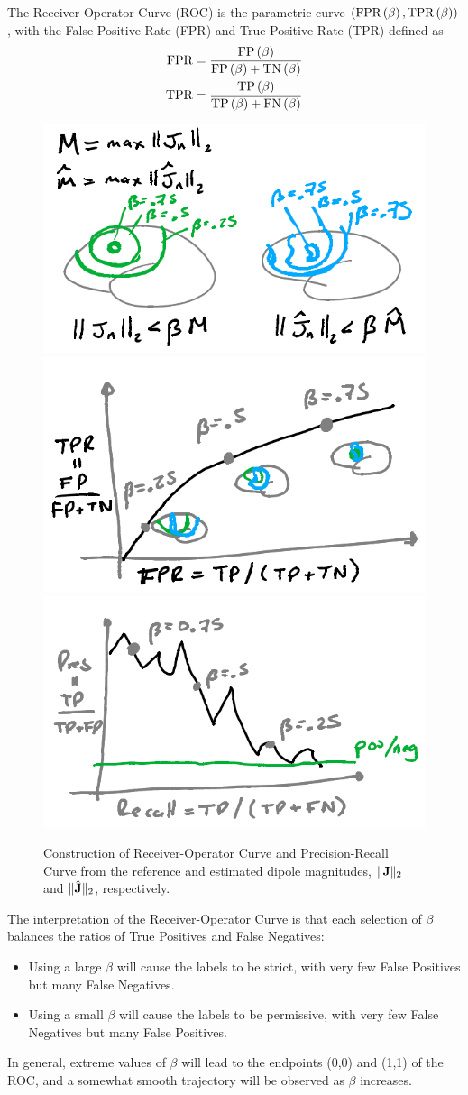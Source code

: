The Receiver-Operator Curve (ROC) is the parametric curve 
$\left( \text{FPR}\left( \beta \right), \text{TPR}\left( \beta \right) \right)$, with the False Positive Rate (FPR) and True Positive Rate (TPR) defined as
\begin{align}
\text{FPR}
&=
\frac{ \text{FP}\left( \beta \right) }{\text{FP}\left( \beta \right) + \text{TN}\left( \beta \right)}
\\
\text{TPR}
&=
\frac{ \text{TP}\left( \beta \right) }{\text{TP}\left( \beta \right) + \text{FN}\left( \beta \right)}
\end{align}

\begin{figure}
\centering
\includegraphics[width=0.8\linewidth]{./img_dev/nsCurves1}
%
\includegraphics[width=0.4\linewidth]{./img_dev/nsCurves2}
\includegraphics[width=0.4\linewidth]{./img_dev/nsCurves3}
\caption{Construction of Receiver-Operator Curve and Precision-Recall Curve from the reference and estimated dipole magnitudes, $\lVert {\mathbf{J}} \rVert_2$ and $\lVert \hat{\mathbf{J}} \rVert_2$, respectively.}
\end{figure}

The interpretation of the Receiver-Operator Curve is that each selection of $\beta$ balances the ratios of True Positives and False Negatives:
\begin{itemize}
\item 
Using a large $\beta$ will cause the labels to be strict, with very few False Positives but many False Negatives.
\item
Using a small $\beta$ will cause the labels to be permissive, with very few False Negatives but many False Positives.
\end{itemize}
In general, extreme values of $\beta$ will lead to the endpoints (0,0) and (1,1) of the ROC, and a somewhat smooth trajectory will be observed as $\beta$ increases.

